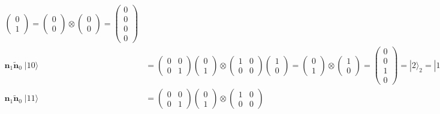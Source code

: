 \documentclass{article}
\begin{document}
\begin{align*}
     \begin{pmatrix}0\\1\end{pmatrix}
     = \begin{pmatrix}0\\0\end{pmatrix}
     \otimes
     \begin{pmatrix}0\\0\end{pmatrix}
     = \begin{pmatrix}0\\0\\0\\0\end{pmatrix}\\
\bm{n}_1\bm{\widetilde{n}}_0 \; |10\rangle
  &= \begin{pmatrix}0 & 0\\0 & 1\end{pmatrix}
     \begin{pmatrix}0\\1\end{pmatrix}
     \otimes
     \begin{pmatrix}1 & 0\\0 & 0\end{pmatrix}
     \begin{pmatrix}1\\0\end{pmatrix}
     = \begin{pmatrix}0\\1\end{pmatrix}
     \otimes
     \begin{pmatrix}1\\0\end{pmatrix}
     = \begin{pmatrix}0\\0\\1\\0\end{pmatrix}
     = |2\rangle_2
     = |10\rangle
     = \bm{1} |10\rangle\\
\bm{n}_1\bm{\widetilde{n}}_0 \; |11\rangle
  &= \begin{pmatrix}0 & 0\\0 & 1\end{pmatrix}
     \begin{pmatrix}0\\1\end{pmatrix}
     \otimes
     \begin{pmatrix}1 & 0\\0 & 0\end{pmatrix}

\end{align*}
\end{document}
